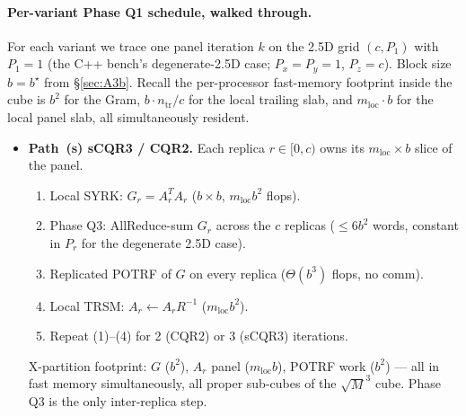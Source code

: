 \documentclass[11pt]{article}
\begin{document}
\paragraph{Per-variant Phase Q1 schedule, walked through.}

For each variant we trace one panel iteration $k$ on the 2.5D grid
$(c, P_1)$ with $P_1 = 1$ (the C++ bench's degenerate-2.5D case;
$P_x = P_y = 1$, $P_z = c$).  Block size $b = b^\star$ from
\S\ref{sec:A3b}.  Recall the per-processor fast-memory footprint
inside the cube is $b^2$ for the Gram, $b \cdot n_{\mathrm{tr}}/c$ for
the local trailing slab, and $m_{\mathrm{loc}} \cdot b$ for the local
panel slab, all simultaneously resident.

\begin{itemize}[leftmargin=2em, itemsep=0.4em]
\item \textbf{Path~(s) sCQR3 / CQR2.} Each replica $r \in [0, c)$
  owns its $m_{\mathrm{loc}} \times b$ slice of the panel.
  \begin{enumerate}[leftmargin=1.5em, label=\textit{(\arabic*)}]
    \item Local SYRK: $G_r = A_r^T A_r$  ($b \times b$, $m_{\mathrm{loc}} b^2$ flops).
    \item Phase Q3: AllReduce-sum $G_r$ across the $c$ replicas
          ($\le 6 b^2$ words, constant in $P_r$ for the
          degenerate 2.5D case).
    \item Replicated POTRF of $G$ on every replica
          ($\Theta(b^3)$ flops, no comm).
    \item Local TRSM: $A_r \leftarrow A_r R^{-1}$ ($m_{\mathrm{loc}} b^2$).
    \item Repeat (1)--(4) for 2 (CQR2) or 3 (sCQR3) iterations.
  \end{enumerate}
  X-partition footprint: $G$ ($b^2$), $A_r$ panel ($m_{\mathrm{loc}} b$),
  POTRF work ($b^2$) --- all in fast memory simultaneously, all proper
  sub-cubes of the $\sqrt{M}^3$ cube.  Phase Q3 is the only
  inter-replica step.


\end{itemize}
\end{document}
